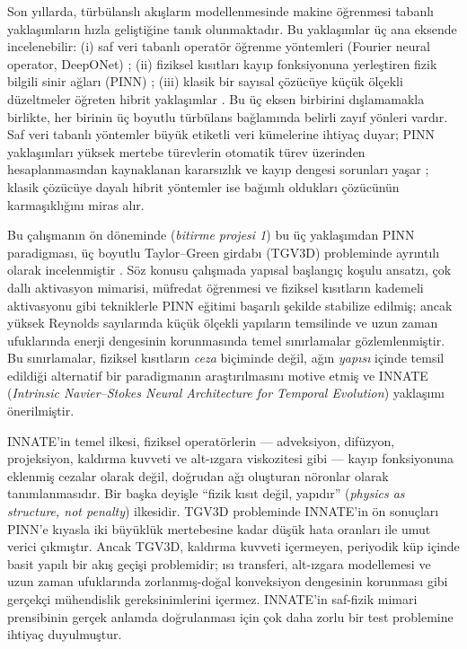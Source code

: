 Son yıllarda, türbülanslı akışların modellenmesinde makine öğrenmesi tabanlı yaklaşımların hızla geliştiğine tanık olunmaktadır. Bu yaklaşımlar üç ana eksende incelenebilir: (i) saf veri tabanlı operatör öğrenme yöntemleri (Fourier neural operator, DeepONet) \cite{li_fno_2021, lu_deeponet_2021}; (ii) fiziksel kısıtları kayıp fonksiyonuna yerleştiren fizik bilgili sinir ağları (PINN) \cite{raissi_pinn_2019}; (iii) klasik bir sayısal çözücüye küçük ölçekli düzeltmeler öğreten hibrit yaklaşımlar \cite{kochkov_ml_cfd_2021}. Bu üç eksen birbirini dışlamamakla birlikte, her birinin üç boyutlu türbülans bağlamında belirli zayıf yönleri vardır. Saf veri tabanlı yöntemler büyük etiketli veri kümelerine ihtiyaç duyar; PINN yaklaşımları yüksek mertebe türevlerin otomatik türev üzerinden hesaplanmasından kaynaklanan kararsızlık ve kayıp dengesi sorunları yaşar \cite{krishnapriyan_failure_2021, wang_gradient_2021}; klasik çözücüye dayalı hibrit yöntemler ise bağımlı oldukları çözücünün karmaşıklığını miras alır.

Bu çalışmanın ön döneminde (\textit{bitirme projesi 1}) bu üç yaklaşımdan PINN paradigması, üç boyutlu Taylor--Green girdabı (TGV3D) probleminde ayrıntılı olarak incelenmiştir \cite{tezgocen_bitirme1_2026}. Söz konusu çalışmada yapısal başlangıç koşulu ansatzı, çok dallı aktivasyon mimarisi, müfredat öğrenmesi ve fiziksel kısıtların kademeli aktivasyonu gibi tekniklerle PINN eğitimi başarılı şekilde stabilize edilmiş; ancak yüksek Reynolds sayılarında küçük ölçekli yapıların temsilinde ve uzun zaman ufuklarında enerji dengesinin korunmasında temel sınırlamalar gözlemlenmiştir. Bu sınırlamalar, fiziksel kısıtların \emph{ceza} biçiminde değil, ağın \emph{yapısı} içinde temsil edildiği alternatif bir paradigmanın araştırılmasını motive etmiş ve INNATE (\textit{Intrinsic Navier--Stokes Neural Architecture for Temporal Evolution}) yaklaşımı önerilmiştir.

INNATE'in temel ilkesi, fiziksel operatörlerin --- adveksiyon, difüzyon, projeksiyon, kaldırma kuvveti ve alt-ızgara viskozitesi gibi --- kayıp fonksiyonuna eklenmiş cezalar olarak değil, doğrudan ağı oluşturan nöronlar olarak tanımlanmasıdır. Bir başka deyişle ``fizik kısıt değil, yapıdır'' (\textit{physics as structure, not penalty}) ilkesidir. TGV3D probleminde INNATE'in ön sonuçları PINN'e kıyasla iki büyüklük mertebesine kadar düşük hata oranları ile umut verici çıkmıştır. Ancak TGV3D, kaldırma kuvveti içermeyen, periyodik küp içinde basit yapılı bir akış geçişi problemidir; ısı transferi, alt-ızgara modellemesi ve uzun zaman ufuklarında zorlanmış-doğal konveksiyon dengesinin korunması gibi gerçekçi mühendislik gereksinimlerini içermez. INNATE'in saf-fizik mimari prensibinin gerçek anlamda doğrulanması için çok daha zorlu bir test problemine ihtiyaç duyulmuştur.

